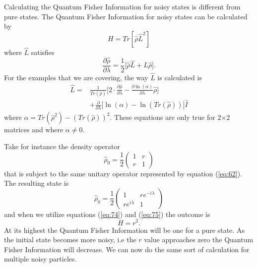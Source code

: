 \documentclass[twocolumn]{article}
\begin{document}
Calculating the Quantum Fisher Information for noisy states is different from pure states. The Quantum Fisher Information for noisy states can be calculated by
\begin{equation} \label{eq:74}
H=Tr[\hat{\rho}\hat{L}^2]
\end{equation}
where $\hat{L}$ satisfies
\begin{equation}\label{eq:75}
\frac{\partial\hat{\rho}}{\partial\lambda}=\frac{1}{2}\big[\hat{\rho}\hat{L}+\hat{L}\hat{\rho}\big].
\end{equation}
For the examples that we are covering, the way $\hat{L}$ is calculated is
\begin{align} \label{eq:76                                                                                  }
\hat{L}=&\frac{1}{Tr(\hat{\rho})}\Big[2\cdot\frac{\partial\hat{\rho}}{\partial\lambda}-\frac{\partial \ln(\alpha)}{\partial\lambda}\hat{\rho}\Big] \nonumber \\
&+\frac{\partial}{\partial\lambda}\Big[\ln(\alpha)-\ln(Tr(\hat{\rho}))\Big]\hat{I}
\end{align}
\cite{D. Collins} where $\alpha=Tr{(\hat{\rho}^2)}-(Tr(\hat{\rho}))^2$. These equations are only true for 2$\times$2 matrices and where $\alpha\neq 0$.

Take for instance the density operator
\begin{equation} \label{eq:77}
\hat{\rho}_0=\frac{1}{2}
\begin{pmatrix}
1 & r \\
r & 1
\end{pmatrix}
\end{equation}
that is subject to the same unitary operator represented by equation (\ref{eq:62}). The resulting state is
\begin{equation} \label{eq:78}
\hat{\rho}_0=\frac{1}{2}
\begin{pmatrix}
1 & re^{-i\lambda}\\
re^{i\lambda} & 1
\end{pmatrix}
\end{equation}
and when we utilize equations (\ref{eq:74}) and (\ref{eq:75}) the outcome is
\begin{equation} \label{eq:79}
H=r^2.
\end{equation}
At its highest the Quantum Fisher Information will be one for a pure state. As the initial state becomes more noisy, i.e the $r$ value approaches zero the Quantum Fisher Information will decrease.  We can now do the same sort of calculation for multiple noisy particles.
\end{document}
